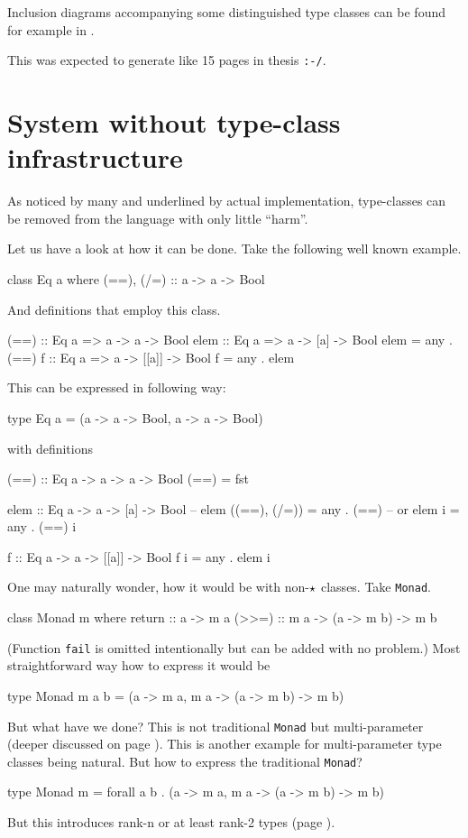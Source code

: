 \documentclass[11pt,oneside,draft]{fithesis2}
\newcommand\uv[1]{``#1''}
\theoremstyle{definition}
\begin{document}
Inclusion diagrams accompanying some distinguished type classes can be found for
example in \cite{typeclassopedia}.

This was expected to generate like 15 pages in thesis \verb~:-/~.

\section{System without type-class infrastructure}

As noticed by many and underlined by actual implementation, type-classes can be removed
from the language with only little \uv{harm}.

Let us have a look at how it can be done. Take the following well known example.
\begin{code}
class Eq a where
    (==), (/=) :: a -> a -> Bool
\end{code}
And definitions that employ this class.
\begin{code}
(==) :: Eq a => a -> a -> Bool
elem :: Eq a => a -> [a] -> Bool
elem = any . (==)
f :: Eq a => a -> [[a]] -> Bool
f = any . elem
\end{code}
This can be expressed in following way:
\begin{code}
type Eq a = (a -> a -> Bool, a -> a -> Bool)
\end{code}
with definitions
\begin{code}
(==) :: Eq a -> a -> a -> Bool
(==) = fst

elem :: Eq a -> a -> [a] -> Bool
-- elem ((==), (/=)) = any . (==)
-- or
elem i = any . (==) i

f :: Eq a -> a -> [[a]] -> Bool
f i = any . elem i
\end{code}

One may naturally wonder, how it would be with non-\(\star\) classes.
Take \texttt{Monad}.
\begin{code}
class Monad m where
	return :: a -> m a
	(>>=) :: m a -> (a -> m b) -> m b
\end{code}
(Function \texttt{fail} is omitted intentionally but can be added with
no problem.)
Most straightforward way how to express it would be
\begin{code}
type Monad m a b = (a -> m a, m a -> (a -> m b) -> m b)
\end{code}
But what have we done? This is not traditional \texttt{Monad}
but multi-parameter (deeper discussed on page
\pageref{extension:multiparam}). This is another example for
multi-parameter type classes being natural. But how to express the
traditional \texttt{Monad}?
\begin{code}
type Monad m = forall a b . (a -> m a, m a -> (a -> m b) -> m b)
\end{code}
But this introduces rank-n or at least rank-2 types (page
\pageref{extension:rankn}).
\end{document}
